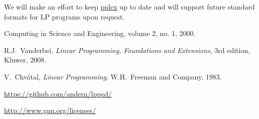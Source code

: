 \documentclass[ukenglish]{nik}
\begin{document}
We will make an effort to keep \url{pplex} up to date and will support 
future standard formats for LP programs upon request.


\begin{thebibliography}{99}
 Computing in Science and Engineering, volume 2, no. 1, 2000.

 R.J.~Vanderbei, 
\emph{Linear Programming, Foundations and Extensions},
3rd edition, Kluwer, 2008.

 V.~Chv\'atal,
\emph{Linear Programming},
W.H.~Freeman and Company, 1983.

\url{https://github.com/andern/lpped/}

\url{http://www.gnu.org/licenses/}

\end{thebibliography}
\end{document}
